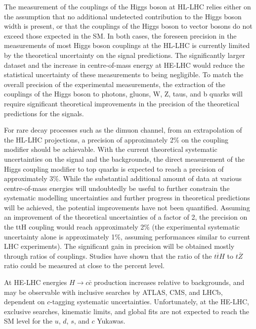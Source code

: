 \documentclass[../report.tex]{subfiles}
\begin{document}
The measurement of the couplings of the Higgs boson at HL-LHC relies either on the assumption that no additional undetected contribution to the Higgs boson width is present, or that the couplings of the Higgs boson to vector bosons do not exceed those expected in the SM. In both cases, the foreseen precision in the measurements of most Higgs boson couplings at the HL-LHC is currently limited by the theoretical uncertainty on the signal predictions. The significantly larger dataset and the increase in centre-of-mass energy at HE-LHC would reduce the statistical uncertainty of these measurements to being negligible.
To match the overall precision of the experimental measurements, the extraction of the couplings of the Higgs boson to photons, gluons, W, Z, taus, and b quarks will require significant theoretical improvements in the precision of the theoretical predictions for the signals.

For rare decay processes such as the dimuon channel, from an extrapolation of the HL-LHC projections, a precision of approximately 2\% on the coupling modifier 
should be achievable.
 With the current theoretical systematic uncertainties on the signal and the backgrounds, the direct measurement of the Higgs coupling modifier to top quarks is expected to reach a precision of approximately 3\%. While the substantial additional amount of data at various centre-of-mass energies will undoubtedly be useful to further constrain the systematic modelling uncertainties and further progress in theoretical predictions will be achieved, the potential improvements have not been quantified. Assuming an improvement of the theoretical uncertainties of a factor of 2, the precision on the ttH coupling would reach approximately 2\% (the experimental systematic uncertainty alone is approximately 1\%, assuming performances similar to current LHC experiments). The significant gain in precision will be obtained mostly through ratios of couplings. Studies have shown that the ratio of the $t\overline{t}H$ to $t\overline{Z}$ ratio could be measured at close to the percent level.

At HE-LHC energies $H \to c\bar{c}$ production increases relative to backgrounds, and may be observable with inclusive searches by ATLAS, CMS, and LHCb, dependent on $c$-tagging systematic uncertainties. Unfortunately, at the HE-LHC, exclusive searches, kinematic limits, and global fits are not expected to reach the SM level for the $u$, $d$, $s$, and $c$ Yukawas.
\end{document}
